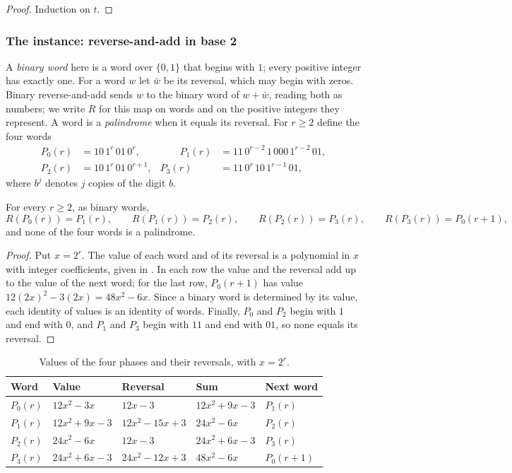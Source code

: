 \begin{proof}
Induction on $t$.
\end{proof}

\subsubsection*{The instance: reverse-and-add in base 2}\label{sec:reverse-add}

A \emph{binary word} here is a word over $\{0,1\}$ that begins with $1$; every positive integer has
exactly one. For a word $w$ let $\bar w$ be its reversal, which may begin with zeros. Binary
reverse-and-add sends $w$ to the binary word of $w + \bar w$, reading both as numbers; we write
$R$ for this map on words and on the positive integers they represent. A word is a
\emph{palindrome} when it equals its reversal. For $r \ge 2$ define the four words
\[
\begin{aligned}
  P_0(r) &= 10\,1^r\,01\,0^r, &\qquad
  P_1(r) &= 11\,0^{r-2}\,1\,000\,1^{r-2}\,01, \\
  P_2(r) &= 10\,1^r\,01\,0^{r+1}, &
  P_3(r) &= 11\,0^r\,10\,1^{r-1}\,01,
\end{aligned}
\]
where $b^j$ denotes $j$ copies of the digit $b$.

\begin{theorem}\label{thm:four-phase}
For every $r \ge 2$, as binary words,
\[
  R(P_0(r)) = P_1(r), \qquad R(P_1(r)) = P_2(r), \qquad R(P_2(r)) = P_3(r), \qquad
  R(P_3(r)) = P_0(r+1),
\]
and none of the four words is a palindrome.
\end{theorem}

\begin{proof}
Put $x = 2^r$. The value of each word and of its reversal is a polynomial in $x$ with integer
coefficients, given in . In each row the value and the reversal add up to the
value of the next word; for the last row, $P_0(r+1)$ has value $12(2x)^2 - 3(2x) = 48x^2 - 6x$.
Since a binary word is determined by its value, each identity of values is an identity of words.
Finally, $P_0$ and $P_2$ begin with $1$ and end with $0$, and $P_1$ and $P_3$ begin with $11$ and
end with $01$, so none equals its reversal.
\end{proof}

\begin{table}[htbp]
\centering
\small
\caption{Values of the four phases and their reversals, with $x = 2^r$.}\label{tab:four-phase}
\begin{tabular}{@{}lllll@{}}
\toprule
Word & Value & Reversal & Sum & Next word \\
\midrule
$P_0(r)$ & $12x^2 - 3x$ & $12x - 3$ & $12x^2 + 9x - 3$ & $P_1(r)$ \\
$P_1(r)$ & $12x^2 + 9x - 3$ & $12x^2 - 15x + 3$ & $24x^2 - 6x$ & $P_2(r)$ \\
$P_2(r)$ & $24x^2 - 6x$ & $12x - 3$ & $24x^2 + 6x - 3$ & $P_3(r)$ \\
$P_3(r)$ & $24x^2 + 6x - 3$ & $24x^2 - 12x + 3$ & $48x^2 - 6x$ & $P_0(r+1)$ \\
\bottomrule
\end{tabular}
\end{table}

